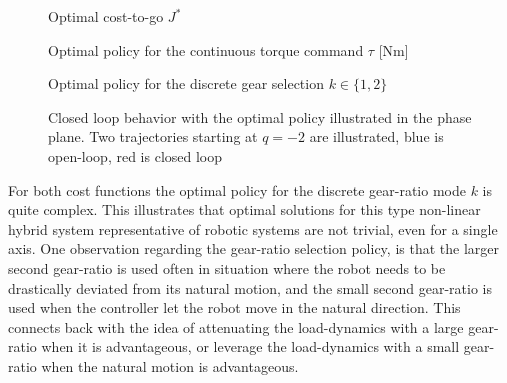 \begin{figure}[p]
        \centering
        \caption{Optimal cost-to-go $J^*$}\label{fig:J}
\end{figure}

\begin{figure}[p]
        \centering
        \caption{Optimal policy for the continuous torque command $\tau$ [Nm]}\label{fig:u0}
\end{figure}

\begin{figure}[p]
        \centering
        \caption{Optimal policy for the discrete gear selection $k \in \{1,2\}$}\label{fig:u1}
\end{figure}

\begin{figure}[p]
        \centering
        \caption[Closed loop behavior in the phase plane]{Closed loop behavior with the optimal policy illustrated in the phase plane. Two trajectories starting at $q=-2$ are illustrated, blue is open-loop, red is closed loop}\label{fig:phase_plane}
\end{figure}

For both cost functions the optimal policy for the discrete gear-ratio mode $k$ is quite complex. This illustrates that optimal solutions for this type non-linear hybrid system representative of robotic systems are not trivial, even for a single axis. One observation regarding the gear-ratio selection policy, is that the larger second gear-ratio is used often in situation where the robot needs to be drastically deviated from its natural motion, and the small second gear-ratio is used when the controller let the robot move in the natural direction. This connects back with the idea of attenuating the load-dynamics with a large gear-ratio when it is advantageous, or leverage the load-dynamics with a small gear-ratio when the natural motion is advantageous. 




